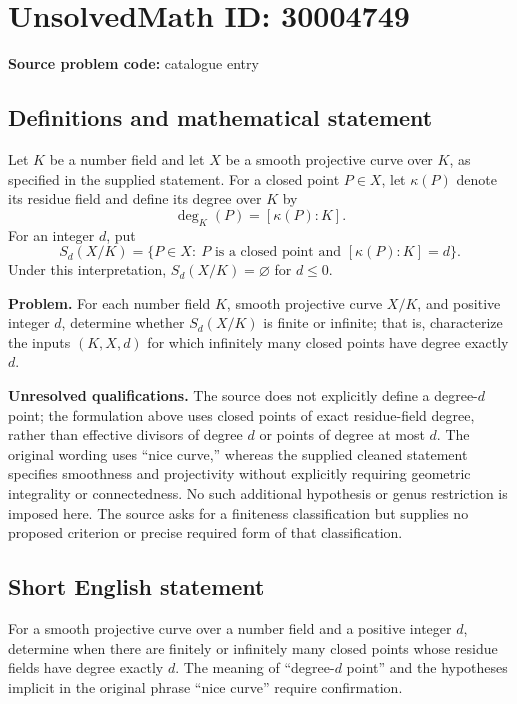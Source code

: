 \documentclass[11pt]{article}
\begin{document}
\section*{UnsolvedMath ID: 30004749}
\textbf{Source problem code:} catalogue entry
\subsection{Definitions and mathematical statement}
Let \(K\) be a number field and let \(X\) be a smooth projective curve over \(K\), as specified in the supplied statement. For a closed point \(P\in X\), let \(\kappa(P)\) denote its residue field and define its degree over \(K\) by
\[
\deg_K(P)=[\kappa(P):K].
\]
For an integer \(d\), put
\[
S_d(X/K)=\{P\in X:\ P\text{ is a closed point and }[\kappa(P):K]=d\}.
\]
Under this interpretation, \(S_d(X/K)=\varnothing\) for \(d\leq 0\).

\textbf{Problem.} For each number field \(K\), smooth projective curve \(X/K\), and positive integer \(d\), determine whether \(S_d(X/K)\) is finite or infinite; that is, characterize the inputs \((K,X,d)\) for which infinitely many closed points have degree exactly \(d\).

\textbf{Unresolved qualifications.} The source does not explicitly define a degree-\(d\) point; the formulation above uses closed points of exact residue-field degree, rather than effective divisors of degree \(d\) or points of degree at most \(d\). The original wording uses ``nice curve,'' whereas the supplied cleaned statement specifies smoothness and projectivity without explicitly requiring geometric integrality or connectedness. No such additional hypothesis or genus restriction is imposed here. The source asks for a finiteness classification but supplies no proposed criterion or precise required form of that classification.
\subsection{Short English statement}
For a smooth projective curve over a number field and a positive integer \(d\), determine when there are finitely or infinitely many closed points whose residue fields have degree exactly \(d\). The meaning of ``degree-\(d\) point'' and the hypotheses implicit in the original phrase ``nice curve'' require confirmation.
\end{document}
